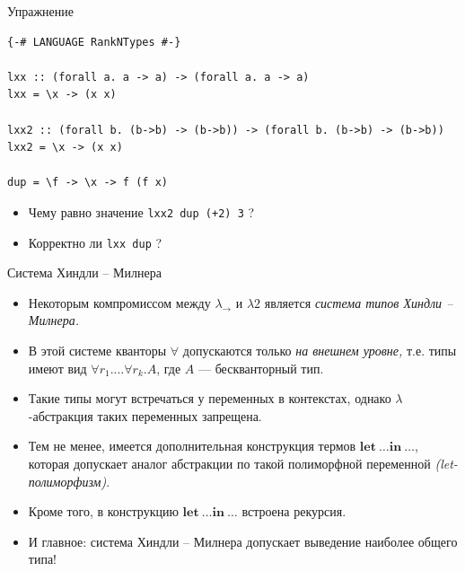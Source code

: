 \documentclass[xcolor=dvipsnames]{beamer}
\begin{document}
\begin{frame}[fragile]{Упражнение}

{\footnotesize
\begin{verbatim}
{-# LANGUAGE RankNTypes #-}

lxx :: (forall a. a -> a) -> (forall a. a -> a)
lxx = \x -> (x x) 

lxx2 :: (forall b. (b->b) -> (b->b)) -> (forall b. (b->b) -> (b->b))
lxx2 = \x -> (x x)

dup = \f -> \x -> f (f x)
\end{verbatim}
}

\begin{itemize}
 \item Чему равно значение \texttt{lxx2 dup}\texttt{ (+2) 3} ?
 \item Корректно ли \texttt{lxx dup} ?
\end{itemize}

 
\end{frame}


\begin{frame}{Система Хиндли -- Милнера}

\begin{itemize}[<+->]
 \item Некоторым компромиссом между $\lambda_\to$ и $\lambda 2$ является {\em система типов Хиндли -- Милнера.}
 \item В этой системе кванторы $\forall$ допускаются только {\em на внешнем уровне,} т.е. типы имеют вид $\forall r_1 . \ldots  \forall r_k . A$, где $A$ --- бескванторный тип.
 \item Такие типы могут встречаться у переменных в контекстах, однако $\lambda$-абстракция таких переменных запрещена.
 \item Тем не менее, имеется дополнительная конструкция термов $\mathbf{let}\ \ldots \mathbf{in}\ \ldots$, которая допускает аналог абстракции по такой полиморфной переменной {\em (let-полиморфизм)}.
 \item Кроме того, в конструкцию $\mathbf{let}\ \ldots \mathbf{in}\ \ldots$ встроена рекурсия.
 \item И главное: система Хиндли -- Милнера допускает выведение наиболее общего типа!
\end{itemize}

 
\end{frame}
\end{document}
